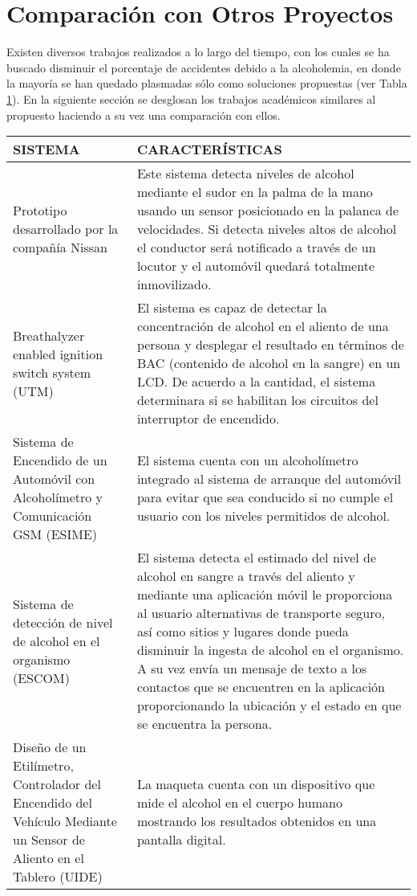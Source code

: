\section{Comparación con Otros Proyectos}
Existen diversos trabajos realizados a lo largo del tiempo, con los cuales se ha buscado disminuir el porcentaje de accidentes debido a la alcoholemia, en donde la mayoría se han quedado plasmadas sólo como soluciones propuestas (ver Tabla \ref{tab:comparacion}). En la siguiente sección se desglosan los trabajos académicos similares al propuesto haciendo a su vez una comparación con ellos.
\begin{table}[ht]
    \noindent \centering \resizebox{\textwidth}{!}
    {        
        \begin{tabular}{|p{4cm}|p{\textwidth}|}
            \hline
                SISTEMA & CARACTERÍSTICAS \\
            \hline
                Prototipo desarrollado por la compañía Nissan & Este sistema detecta niveles de alcohol mediante el sudor en la palma de la mano usando un sensor posicionado en la palanca de velocidades. Si detecta niveles altos de alcohol el conductor será notificado a través de un locutor y el automóvil quedará totalmente inmovilizado. \cite{drunk_driving_nissan} \\
            \hline
                Breathalyzer enabled ignition switch system (UTM) & El sistema es capaz de detectar la concentración de alcohol en el aliento de una persona y desplegar el resultado en términos de BAC (contenido de alcohol en la sangre) en un LCD. De acuerdo a la cantidad, el sistema determinara si se habilitan los circuitos del interruptor de encendido. \cite{breathalyzer_enabled} \\
            \hline
                Sistema de Encendido de un Automóvil con Alcoholímetro y Comunicación GSM (ESIME) & El sistema cuenta con un alcoholímetro integrado al sistema de arranque del automóvil para evitar que sea conducido si no cumple el usuario con los niveles permitidos de alcohol. \cite{sistema_de_encendido_esime} \\
            \hline
                Sistema de detección de nivel de alcohol en el organismo (ESCOM) & El sistema detecta el estimado del nivel de alcohol en sangre a través del aliento y mediante una aplicación móvil le proporciona al usuario alternativas de transporte seguro, así como sitios y lugares donde pueda disminuir la ingesta de alcohol en el organismo. A su vez envía un mensaje de texto a los contactos que se encuentren en la aplicación proporcionando la ubicación y el estado en que se encuentra la persona. \cite{sistema_de_deteccion_escom} \\
            \hline
                Diseño de un Etilímetro, Controlador del Encendido del Vehículo Mediante un Sensor de Aliento en el Tablero (UIDE) & La maqueta cuenta con un dispositivo que mide el alcohol en el cuerpo humano mostrando los resultados obtenidos en una pantalla digital. \cite{diseno_etilimetro_uide} \\
            \hline
        \end{tabular}
    }
     \label{tab:comparacion}
\end{table}